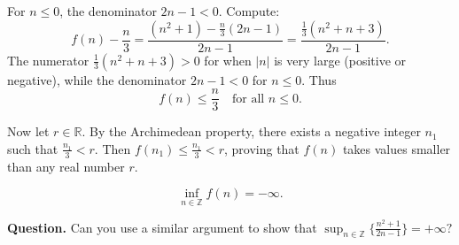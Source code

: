 \documentclass[11pt]{article}
\begin{document}
For \(n\le 0\), the denominator \(2n-1<0\). Compute:
\[
f(n)-\frac{n}{3}
=\frac{(n^2+1)-\frac{n}{3}(2n-1)}{2n-1}
=\frac{\tfrac13(n^2+n+3)}{2n-1}.
\]
The numerator \(\tfrac13(n^2+n+3)>0\) for when $|n|$ is very large (positive or negative), while the denominator \(2n-1<0\) for \(n\le0\).
Thus
\[
\boxed{f(n)\le \frac{n}{3}\quad\text{for all }n\le0.}
\]

Now let \(r\in\mathbb{R}\).
By the Archimedean property, there exists a negative integer \(n_1\) such that \(\tfrac{n_1}{3}<r\).
Then \(f(n_1)\le\tfrac{n_1}{3}<r\), proving that \(f(n)\) takes values smaller than any real number \(r\).

\[
\boxed{\inf_{n\in\mathbb{Z}} f(n)=-\infty.}
\]

\vskip 2mm
\textbf{Question.}
Can you use a similar argument to show that $\sup_{n\in\mathbb{Z}} \big\{ \frac{n^2+1}{2n-1}\big\} =+\infty?$
\end{document}
